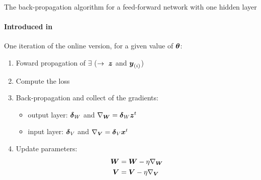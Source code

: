 \begin{frame}{The back-propagation algorithm for a feed-forward network with one hidden layer}
  \framesubtitle{Introduced in \cite{Rumelhart86BP}}
  One iteration of the online version, for a given value of $\boldsymbol{\theta}$:
  \begin{enumerate}
  \item Foward propagation of $\exi$ ($\rightarrow\ \boldsymbol{z}$ and $\boldsymbol{y}_{(i)}$)
  \item Compute the loss 
  \item Back-propagation and collect of  the gradients:
    \begin{itemize}
    \item output layer: $\boldsymbol{\delta}_{W}$ and $\nabla_{\boldsymbol{W}} = \boldsymbol{\delta}_{W}\boldsymbol{z}^t$
    \item input layer: $\boldsymbol{\delta}_{V}$ and $\nabla_{\boldsymbol{V}} = \boldsymbol{\delta}_{V}\boldsymbol{x}^t$
    \end{itemize}
  \item Update parameters:
    \begin{align*}
      \boldsymbol{W} &= \boldsymbol{W} - \eta \nabla_{\boldsymbol{W}} \\
      \boldsymbol{V} &= \boldsymbol{V} - \eta \nabla_{\boldsymbol{V}} 
    \end{align*}
  \end{enumerate}
\end{frame}


